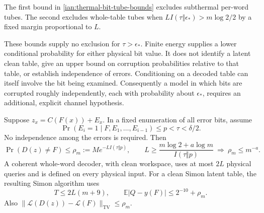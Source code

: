 \begin{remark}
\label{ian:thermal-bit-noise-scope}
The first bound in \eqref{ian:thermal-bit-tube-bounds} excludes
subthermal per-word tubes. The second excludes whole-table tubes
when \(LI(\tau\Vert\epsilon_*)>m\log2/2\) by a fixed margin
proportional to \(L\).

These bounds supply no exclusion for \(\tau>\epsilon_*\).
Finite energy supplies a lower conditional probability for either
physical bit value. It does not identify a latent clean table,
give an upper bound on corruption probabilities relative to that
table, or establish independence of errors. Conditioning on a
decoded table can itself involve the bit being examined.
Consequently a model in which bits are corrupted roughly
independently, each with probability about \(\epsilon_*\), requires
an additional, explicit channel hypothesis.
\end{remark}

\begin{lemma}
\label{ian:thermal-coded-reliability}
Suppose \(z_x=C(F(x))+E_x\). In a fixed enumeration of all error
bits, assume
\[
 \Pr(E_i=1\mid F,E_1,\ldots,E_{i-1})\le p<\tau<\delta/2 .
 \tag{38.12}\label{ian:thermal-error-domination}
\]
No independence among the errors is required. Then
\[
 \Pr(D(z)\ne F)\le
 \rho_m:=M e^{-LI(\tau\Vert p)} ,
 \qquad
 L\ge\frac{m\log2+a\log m}{I(\tau\Vert p)}
 \ \Longrightarrow\ \rho_m\le m^{-a}.
 \tag{38.13}\label{ian:thermal-coded-reliability-bound}
\]
A coherent whole-word decoder, with clean workspace, uses at most
\(2L\) physical queries and is defined on every physical input.
For a clean Simon latent table, the resulting Simon algorithm uses
\[
 T\le2L(m+9),\qquad
 \mathbb E|Q-y(F)|\le2^{-10}+\rho_m .
 \tag{38.14}\label{ian:thermal-coded-simon-readout}
\]
Also
\(\|\mathcal L(D(z))-\mathcal L(F)\|_{\mathrm{TV}}\le\rho_m\).
\end{lemma}

